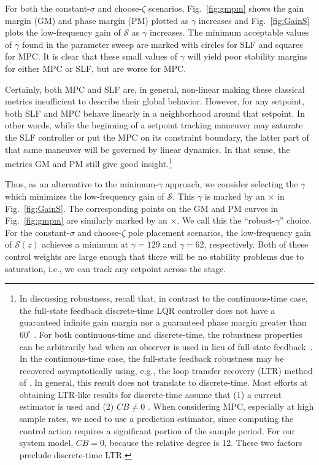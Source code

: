\documentclass[twocolumn,twoside]{IEEEtran}
\begin{document}
For both the constant-$\sigma$ and choose-$\zeta$ scenarios, Fig.~\ref{fig:gmpm} shows the gain margin (GM) and phase margin (PM) plotted as $\gamma$ increases and Fig.~\ref{fig:GainS} plots the low-frequency gain of $\mathcal{S}$ as $\gamma$ increases. The minimum acceptable values of $\gamma$ found in the parameter sweep are marked with circles for SLF and squares for MPC. It is clear that these small values of $\gamma$ will yield poor stability margins for either MPC or SLF, but are worse for MPC.

Certainly, both MPC and SLF are, in general, non-linear making these classical metrics insufficient to describe their global behavior. However, for any setpoint, both SLF and MPC behave linearly in a neighborhood around that setpoint. In other words, while the beginning of a setpoint tracking maneuver may saturate the SLF controller or put the MPC on its constraint boundary, the latter part of that same maneuver will be governed by linear dynamics. In that sense, the metrics GM and PM still give good insight.\footnote{In discussing robustness, recall that, in contrast to the continuous-time case, the full-state feedback discrete-time LQR controller does not have a guaranteed infinite gain margin nor a guaranteed phase margin greater than $60^{\circ}$ \cite{andersson_moore}. For both continuous-time and discrete-time, the robustness properties can be arbitrarily bad when an observer is used in lieu of full-state feedback~\cite{doyle_guaranteed_1978}. In the continuous-time case, the full-state feedback robustness may be recovered asymptotically using, e.g., the loop transfer recovery (LTR) method of \cite{doyle_robustness_1979}. In general, this result does not translate to discrete-time. Most efforts at obtaining LTR-like results for discrete-time assume that (1) a current estimator is used and (2) $CB\neq 0$ \cite{Maciejowski_asymptotic_1985,guaracy_discrete_2015,ishihara_loop_1986}. When considering MPC, especially at high sample rates, we need to use a prediction estimator, since computing the control action requires a significant portion of the sample period. For our system model, $CB=0$, because the relative degree is 12. These two factors preclude discrete-time LTR.} %

Thus, as an alternative to the minimum-$\gamma$ approach, we consider selecting the $\gamma$ which minimizes the low-frequency gain of $\mathcal{S}$. This $\gamma$ is marked by an $\times$ in Fig.~\ref{fig:GainS}. The corresponding points on the GM and PM curves in Fig.~\ref{fig:gmpm} are similarly marked by an $\times$. We call this the ``robust-$\gamma$'' choice.  For the constant-$\sigma$ and choose-$\zeta$ pole placement scenarios, the low-frequency gain of $\mathcal{S}(z)$ achieves a minimum at ${\gamma=129}$ and $\gamma=62$, respectively. Both of these control weights are large enough that there will be no stability problems due to saturation, i.e., we can track any setpoint across the stage. 
\end{document}
